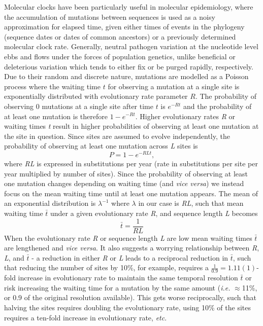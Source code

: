 \documentclass{bmcart}
\begin{document}
Molecular clocks have been particularly useful in molecular epidemiology, where the accumulation of mutations between sequences is used as a noisy approximation for elapsed time, given either times of events in the phylogeny (sequence dates or dates of common ancestors) or a previously determined molecular clock rate.
Generally, neutral pathogen variation at the nucleotide level ebbs and flows under the forces of population genetics, unlike beneficial or deleterious variation which tends to either fix or be purged rapidly, respectively.
Due to their random and discrete nature, mutations are modelled as a Poisson process \cite{yang_computational_2006} where the waiting time $t$ for observing a mutation at a single site is exponentially distributed with evolutionary rate parameter $R$.
The probability of observing 0 mutations at a single site after time $t$ is $e^{-Rt}$ and the probability of at least one mutation is therefore $1-e^{-Rt}$.
Higher evolutionary rates \textit{R} or waiting times \textit{t} result in higher probabilities of observing at least one mutation at the site in question.
Since sites are assumed to evolve independently, the probability of observing at least one mutation across \textit{L} sites is
\begin{equation}
  P = 1-e^{-RLt},
\end{equation}
where \textit{RL} is expressed in substitutions per year (rate in substitutions per site per year multiplied by number of sites).
Since the probability of observing at least one mutation changes depending on waiting time (and \textit{vice versa}) we instead focus on the mean waiting time until at least one mutation appears.
The mean of an exponential distribution is $\lambda^{-1}$ where $\lambda$ in our case is \textit{RL}, such that mean waiting time $\bar{t}$ under a given evolutionary rate \textit{R}, and sequence length \textit{L} becomes
\begin{equation}
  \bar{t} = \frac{1}{RL}
  \label{horizon}
\end{equation}
When the evolutionary rate \textit{R} or sequence length \textit{L} are low mean waiting times $\bar{t}$ are lengthened and \textit{vice versa}.
It also suggests a worrying relationship between \textit{R}, \textit{L}, and $\bar{t}$ - a reduction in either \textit{R} or \textit{L} leads to a reciprocal reduction in $\bar{t}$, such that reducing the number of sites by 10\%, for example, requires a $\frac{1}{0.9} = 1.11(1)$-fold increase in evolutionary rate to maintain the same temporal resolution $\bar{t}$ or risk increasing the waiting time for a mutation by the same amount (\textit{i.e.} $\approx$11\%, or 0.9 of the original resolution available).
This gets worse reciprocally, such that halving the sites requires doubling the evolutionary rate, using 10\% of the sites requires a ten-fold increase in evolutionary rate, \textit{etc}.
\end{document}
